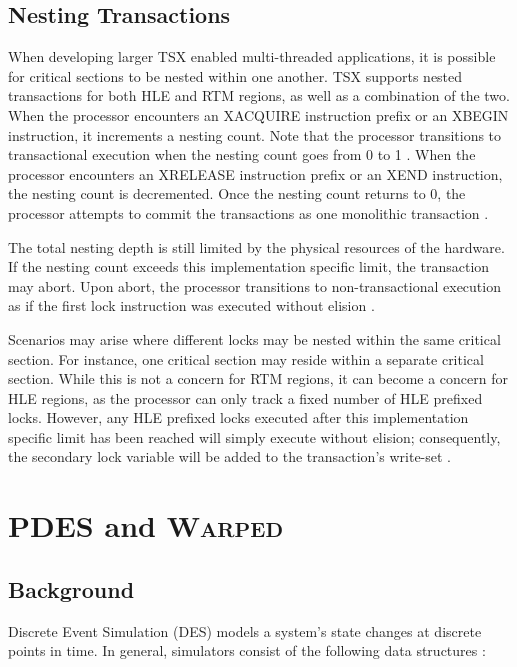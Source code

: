 \documentclass[11pt]{book}
\begin{document}
\section{Nesting Transactions}

When developing larger TSX enabled multi-threaded applications, it is possible for
critical sections to be nested within one another.  TSX supports nested transactions for
both HLE and RTM regions, as well as a combination of the two.  When the processor
encounters an XACQUIRE instruction prefix or an XBEGIN instruction, it increments a
nesting count.  Note that the processor transitions to transactional execution when the
nesting count goes from 0 to 1 \cite{intel_prog_ref}.  When the processor encounters an
XRELEASE instruction prefix or an XEND instruction, the nesting count is decremented.
Once the nesting count returns to 0, the processor attempts to commit the transactions as
one monolithic transaction \cite{intel_prog_ref}.

The total nesting depth is still limited by the physical resources of the hardware.  If
the nesting count exceeds this implementation specific limit, the transaction may abort.
Upon abort, the processor transitions to non-transactional execution as if the first lock
instruction was executed without elision \cite{intel_prog_ref}.

Scenarios may arise where different locks may be nested within the same critical section.
For instance, one critical section may reside within a separate critical section.  While
this is not a concern for RTM regions, it can become a concern for HLE regions, as the
processor can only track a fixed number of HLE prefixed locks.  However, any HLE prefixed
locks executed after this implementation specific limit has been reached will simply
execute without elision; consequently, the secondary lock variable will be added to the
transaction's write-set \cite{intel_prog_ref}.

\chapter{PDES and \textsc{Warped}}

\section{Background}

Discrete Event Simulation (DES) models a system's state changes at discrete points in
time.  In general, simulators consist of the following data structures \cite{fujimoto}:
\end{document}
